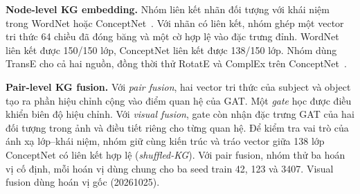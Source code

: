 \textbf{Node-level KG embedding.} Nhóm liên kết nhãn đối tượng với khái niệm trong
WordNet hoặc ConceptNet~\cite{miller1995wordnet,speer2017conceptnet}. Với nhãn
có liên kết, nhóm ghép một vector tri thức 64 chiều đã đóng băng và một cờ
hợp lệ vào đặc trưng đỉnh. WordNet liên kết được 150/150 lớp, ConceptNet
liên kết được 138/150 lớp. Nhóm dùng TransE cho cả hai nguồn, đồng thời thử
RotatE và ComplEx trên ConceptNet~\cite{bordes2013transe,sun2019rotate,trouillon2016complex}.

\textbf{Pair-level KG fusion.} Với \textit{pair fusion}, hai vector tri thức của
subject và object tạo ra phần hiệu chỉnh cộng vào điểm quan hệ của GAT.
Một \textit{gate} học được điều khiển biên độ hiệu chỉnh. Với \textit{visual fusion},
gate còn nhận đặc trưng GAT của hai đối tượng trong ảnh và điều tiết riêng
cho từng quan hệ. Để kiểm tra vai trò của ánh xạ lớp--khái niệm, nhóm giữ
cùng kiến trúc và tráo vector giữa 138 lớp ConceptNet có liên kết hợp lệ
(\textit{shuffled-KG}). Với pair fusion, nhóm thử ba hoán vị cố định,
mỗi hoán vị dùng chung cho ba seed train 42, 123 và 3407. Visual fusion
dùng hoán vị gốc (20261025).

